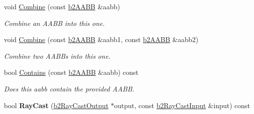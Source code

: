 \begin{DoxyCompactItemize}
\mbox{\label{structb2AABB_ad551edba62d2ad6094672a9ba3e26496}} 
void \mbox{\hyperlink{structb2AABB_ad551edba62d2ad6094672a9ba3e26496}{Combine}} (const \mbox{\hyperlink{structb2AABB}{b2\+A\+A\+BB}} \&aabb)
\begin{DoxyCompactList}\small\item\em Combine an A\+A\+BB into this one. \end{DoxyCompactList}\item 
\mbox{\label{structb2AABB_a34b9c7d824df845c10caa9c12ae90452}} 
void \mbox{\hyperlink{structb2AABB_a34b9c7d824df845c10caa9c12ae90452}{Combine}} (const \mbox{\hyperlink{structb2AABB}{b2\+A\+A\+BB}} \&aabb1, const \mbox{\hyperlink{structb2AABB}{b2\+A\+A\+BB}} \&aabb2)
\begin{DoxyCompactList}\small\item\em Combine two A\+A\+B\+Bs into this one. \end{DoxyCompactList}\item 
\mbox{\label{structb2AABB_acf98175d3a53bca755d5c4852fa85a00}} 
bool \mbox{\hyperlink{structb2AABB_acf98175d3a53bca755d5c4852fa85a00}{Contains}} (const \mbox{\hyperlink{structb2AABB}{b2\+A\+A\+BB}} \&aabb) const
\begin{DoxyCompactList}\small\item\em Does this aabb contain the provided A\+A\+BB. \end{DoxyCompactList}\item 
\mbox{\label{structb2AABB_af6a8b26716ec07d326e5ce95556e8c7e}} 
bool {\bfseries Ray\+Cast} (\mbox{\hyperlink{structb2RayCastOutput}{b2\+Ray\+Cast\+Output}} $\ast$output, const \mbox{\hyperlink{structb2RayCastInput}{b2\+Ray\+Cast\+Input}} \&input) const
\end{DoxyCompactItemize}
